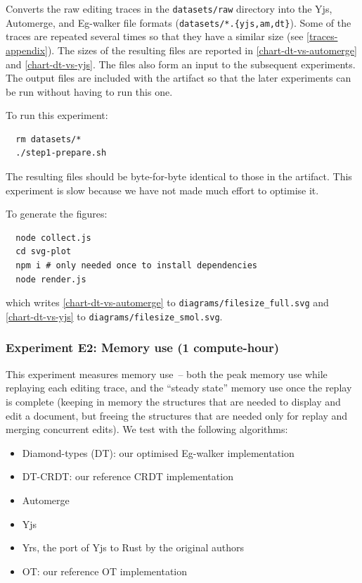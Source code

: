 \documentclass[sigplan,10pt]{acmart}
\begin{document}
Converts the raw editing traces in the \verb|datasets/raw| directory into the Yjs, Automerge, and Eg-walker file formats (\verb|datasets/*.{yjs,am,dt}|).
Some of the traces are repeated several times so that they have a similar size (see \autoref{traces-appendix}).
The sizes of the resulting files are reported in \autoref{chart-dt-vs-automerge} and \autoref{chart-dt-vs-yjs}.
The files also form an input to the subsequent experiments.
The output files are included with the artifact so that the later experiments can be run without having to run this one.

To run this experiment:
\begin{verbatim}
  rm datasets/*
  ./step1-prepare.sh
\end{verbatim}
The resulting files should be byte-for-byte identical to those in the artifact.
This experiment is slow because we have not made much effort to optimise it.

To generate the figures:
\begin{verbatim}
  node collect.js
  cd svg-plot
  npm i # only needed once to install dependencies
  node render.js
\end{verbatim}
which writes \autoref{chart-dt-vs-automerge} to \verb|diagrams/filesize_full.svg| and \autoref{chart-dt-vs-yjs} to \verb|diagrams/filesize_smol.svg|.

\subsubsection{Experiment E2: Memory use (1 compute-hour)}

This experiment measures memory use~-- both the peak memory use while replaying each editing trace, and the ``steady state'' memory use once the replay is complete (keeping in memory the structures that are needed to display and edit a document, but freeing the structures that are needed only for replay and merging concurrent edits).
We test with the following algorithms:
\begin{itemize}
  \item Diamond-types (DT): our optimised Eg-walker implementation
  \item DT-CRDT: our reference CRDT implementation
  \item Automerge~\cite{automerge}
  \item Yjs~\cite{yjs}
  \item Yrs, the port of Yjs to Rust by the original authors~\cite{yrs}
  \item OT: our reference OT implementation
\end{itemize}
\end{document}
